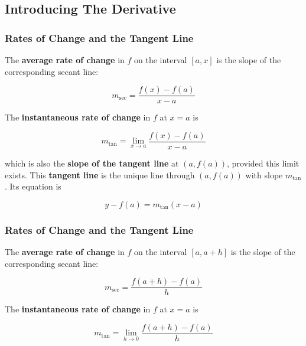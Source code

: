 %
%
%

\subsection{Introducing The Derivative}
\subsubsection{Rates of Change and the Tangent Line}
The \textbf{average rate of change} in $f$ on the interval $[a, x]$ is the slope of the corresponding secant line:

\begin{equation}
    m_\text{sec} = \frac{f(x) - f(a)}{x - a}
\end{equation}

The \textbf{instantaneous rate of change} in $f$ at $x = a$ is 

\begin{equation}
    m_\text{tan} = \lim_{x \rightarrow a} \frac{f(x) - f(a)}{x - a}
\end{equation}

which is also the \textbf{slope of the tangent line} at $(a, f(a))$, provided this limit exists. This \textbf{tangent line} is the unique line through $(a, f(a))$ with slope $m_\text{tan}$. Its equation is

\begin{equation}
    y - f(a) = m_\text{tan}(x - a)
\end{equation}

\subsubsection{Rates of Change and the Tangent Line}
The \textbf{average rate of change} in $f$ on the interval $[a, a + h]$ is the slope of the corresponding secant line:

\begin{equation}
    m_\text{sec} = \frac{f(a + h) - f(a)}{h}
\end{equation}

The \textbf{instantaneous rate of change} in $f$ at $x = a$ is 

\begin{equation}
    m_\text{tan} = \lim_{h \rightarrow 0} \frac{f(a + h) - f(a)}{h}
\end{equation}

